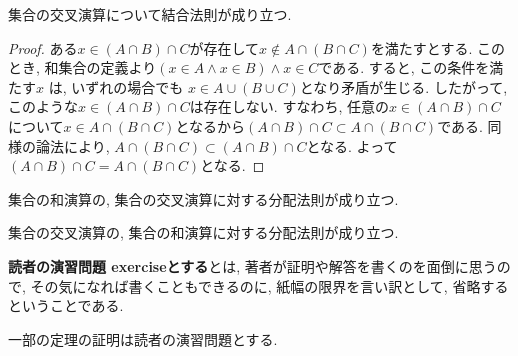 \begin{thm}
集合の交叉演算について結合法則が成り立つ.
\end{thm}
\begin{proof}
ある$x\in (A\cap B)\cap C$が存在して$x\notin A\cap (B\cap C)$を満たすとする.
このとき, 和集合の定義より$(x\in A\land x\in B)\land x\in C$である.
すると, この条件を満たす$x$
は, いずれの場合でも
$x\in A\cup(B\cup C)$となり矛盾が生じる. したがって, このような$x\in (A\cap B)\cap C$は存在しない. すなわち, 任意の$x\in (A\cap B)\cap C$について$x\in A\cap (B\cap C)$となるから$(A\cap B)\cap C\subset A\cap (B\cap C)$である. 
同様の論法により, $A\cap (B\cap C)\subset (A\cap B)\cap C$となる.
よって$(A\cap B)\cap C=A\cap (B\cap C)$となる.
\end{proof}
\begin{thm}
集合の和演算の, 集合の交叉演算に対する分配法則が成り立つ.
\end{thm}
\begin{thm}
集合の交叉演算の, 集合の和演算に対する分配法則が成り立つ.
\end{thm}
\begin{mean}
{\bf 読者の演習問題 exerciseとする}とは, 著者が証明や解答を書くのを面倒に思うので, その気になれば書くこともできるのに, 紙幅の限界を言い訳として, 省略するということである.
\end{mean}
\begin{caution}
一部の定理の証明は読者の演習問題とする.
\end{caution}
\begin{comment}
\begin{mean}
{\bf 論じる}とは筋道を立てて述べることである.
\end{mean}
\begin{mean}
{\bf 対象}とは行為の目標である.
\end{mean}
\begin{caution}
次に示す用法における対象は, 上記の意味をもつ. 
ただし, 後に述べる, 圏に対する対象は, 上記とは異なる特殊な意味をもつ.
\end{caution}
\begin{usage}
論じる対象であるすべての集合を部分集合とする集合を{\bf 全体集合 universe set}という.
\end{usage}
\begin{caution}
全体集合は明らかに論じる対象に依存する.
\end{caution}
\begin{Notation}
全体集合を$\mathrm{U}$で表す.
\end{Notation}
\begin{Def}
集合$A$における全体集合との差集合を 
{\bf 集合$A$の補集合}
という.
\end{Def}
\begin{Notation}
集合$A$の補集合を$A^c$で表す.
\end{Notation}
\end{comment}
